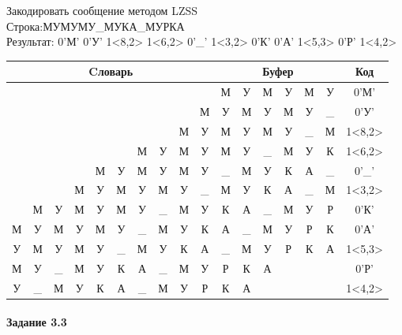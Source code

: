 \documentclass[a4paper, 12pt]{article}
\begin{document}
Закодировать сообщение методом LZSS\\
Строка:МУМУМУ\_МУКА\_МУРКА\\
Результат: 0'М' 0'У' 1<8,2> 1<6,2> 0'\_' 1<3,2> 0'К' 0'А' 1<5,3> 0'Р' 1<4,2>\\
\begin{table}[h!]
\centering
\begin{tabular}{|c|c|c|c|c|c|c|c|c|c|c|c|c|c|c|c|c|}
\hline
\multicolumn{10}{|c|}{Cловарь} & \multicolumn{6}{c|}{Буфер} & Код  \\ \hline
  &   &   &   &   &   &   &   &   &   & М & У & М & У & М & У & 0'М'\\ \hline
  &   &   &   &   &   &   &   &   & М & У & М & У & М & У & \_ & 0'У'\\ \hline
  &   &   &   &   &   &   &   & \cellcolor[HTML]{FFFF00} М & \cellcolor[HTML]{FFFF00} У & \cellcolor[HTML]{FFFF00} М & \cellcolor[HTML]{FFFF00} У & М & У & \_ & М & 1<8,2>\\ \hline
  &   &   &   &   &   & \cellcolor[HTML]{FFFF00} М & \cellcolor[HTML]{FFFF00} У & М & У & \cellcolor[HTML]{FFFF00} М & \cellcolor[HTML]{FFFF00} У & \_ & М & У & К & 1<6,2>\\ \hline
  &   &   &   & М & У & М & У & М & У & \_ & М & У & К & А & \_ & 0'\_'\\ \hline
  &   &   & \cellcolor[HTML]{FFFF00} М & \cellcolor[HTML]{FFFF00} У & М & У & М & У & \_ & \cellcolor[HTML]{FFFF00} М & \cellcolor[HTML]{FFFF00} У & К & А & \_ & М & 1<3,2>\\ \hline
  & М & У & М & У & М & У & \_ & М & У & К & А & \_ & М & У & Р & 0'К'\\ \hline
М & У & М & У & М & У & \_ & М & У & К & А & \_ & М & У & Р & К & 0'А'\\ \hline
У & М & У & М & У & \cellcolor[HTML]{FFFF00} \_ & \cellcolor[HTML]{FFFF00} М & \cellcolor[HTML]{FFFF00} У & К & А & \cellcolor[HTML]{FFFF00} \_ & \cellcolor[HTML]{FFFF00} М & \cellcolor[HTML]{FFFF00} У & Р & К & А & 1<5,3>\\ \hline
М & У & \_ & М & У & К & А & \_ & М & У & Р & К & А &   &   &   & 0'Р'\\ \hline
У & \_ & М & У & \cellcolor[HTML]{FFFF00} К & \cellcolor[HTML]{FFFF00} А & \_ & М & У & Р & \cellcolor[HTML]{FFFF00} К & \cellcolor[HTML]{FFFF00} А &   &   &   &   & 1<4,2>\\ \hline
\end{tabular}
\end{table}

\paragraph{Задание 3.3}
\end{document}

